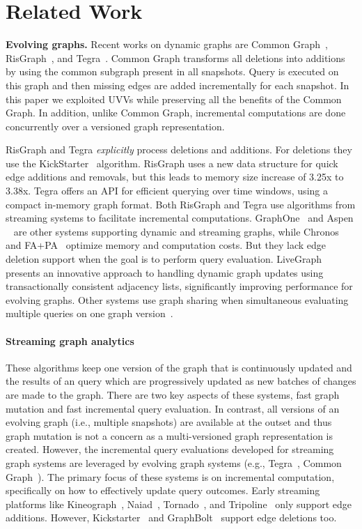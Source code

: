 \section{Related Work}

{\bf Evolving graphs.} Recent works on dynamic graphs are Common Graph~\cite{CommonGraph}, RisGraph~\cite{risgraph}, and Tegra~\cite{tegra}. Common Graph transforms all deletions into additions by using the common subgraph present in all snapshots. Query is executed on this graph and then  missing edges are added incrementally for each snapshot. In this paper we exploited UVVs while preserving all the benefits of the Common Graph. In addition, unlike Common Graph, incremental computations are done concurrently over a versioned graph representation.

RisGraph and Tegra \emph{explicitly} process deletions and additions. For deletions they use the KickStarter~\cite{kickstarter} algorithm. RisGraph uses a new data structure for quick edge additions and removals, but this leads to memory size increase of 3.25x to 3.38x. Tegra offers an API for efficient querying over time windows, using a compact in-memory graph format. Both RisGraph and Tegra use algorithms from streaming systems to facilitate incremental computations. GraphOne~\cite{GraphOne} and Aspen ~\cite{Aspen} are other systems supporting dynamic and streaming graphs, while Chronos~\cite{chronos} and FA+PA~\cite{evog-taco} optimize memory and computation costs. But they lack edge deletion support when the goal is to perform query evaluation. LiveGraph~\cite{LiveGraph} presents an innovative approach to handling dynamic graph updates using transactionally consistent adjacency lists, significantly improving performance for evolving graphs. Other systems use graph sharing when simultaneous evaluating multiple queries on one graph version~\cite{krill, glign, graphm}.

\vspace{-0.075in}
\paragraph*{Streaming graph analytics} These algorithms keep one version of the graph that is continuously updated and the results of an query which are progressively updated as new batches of changes are made to the graph. There are two key aspects of these systems, fast graph mutation and fast incremental query evaluation. In contrast, all versions of an evolving graph (i.e., multiple snapshots) are available at the outset and thus graph mutation is not a concern as a multi-versioned graph representation is created. However, the incremental query evaluations developed for streaming graph systems are leveraged by evolving graph systems (e.g., Tegra~\cite{tegra}, Common Graph~\cite{CommonGraph}).  The primary focus of these systems is on incremental computation, specifically on how to effectively update query outcomes. Early streaming platforms like Kineograph~\cite{kineograph}, Naiad~\cite{naiad}, Tornado~\cite{tornado}, and Tripoline~\cite{tripoline} only support edge additions. However, Kickstarter~\cite{kickstarter} and GraphBolt~\cite{graphbolt} support edge deletions too.
